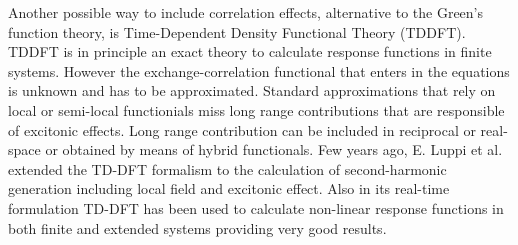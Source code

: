 Another possible way to include correlation effects, alternative to the Green's function theory, is Time-Dependent Density Functional Theory (TDDFT)\cite{PhysRevLett.52.997}. TDDFT is in principle an exact theory to calculate response functions in finite systems. However the exchange-correlation functional that enters in the equations is unknown and has to be approximated. Standard approximations that rely on local or semi-local functionials miss long range contributions that are responsible of excitonic effects\cite{botti2007time}. Long range contribution can be included in reciprocal or real-space or obtained by means of hybrid functionals.\cite{botti2007time} Few years ago, E. Luppi et al. extended the TD-DFT formalism to the calculation of second-harmonic generation including local field and excitonic effect.\cite{PhysRevB.82.235201} 
Also in its real-time formulation TD-DFT has been used to calculate non-linear response functions in both finite and extended systems providing very good results.\cite{takimoto:154114,andrade2007time} 
